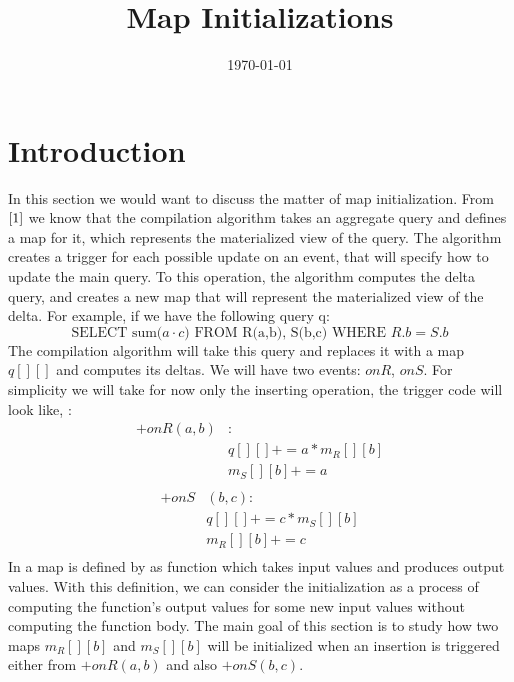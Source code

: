 \documentclass[12pt]{article}
\title{Map Initializations}
\date{\today}
\begin{document}
\maketitle
\section{Introduction}
In this section we would want to discuss the matter of map initialization. From $\cite{1}$ we know that the compilation algorithm takes an aggregate query and defines a map for it, which represents the materialized view of the query. The algorithm creates a trigger for each possible update on an event, that will specify how to update the main query. To this operation, the algorithm computes the delta query, and creates a new map that will represent the materialized view of the delta. For example, if we have the following query q:
\begin{equation}
\mbox{SELECT sum(}a\cdot c\mbox{) FROM R(a,b), S(b,c) WHERE } R.b=S.b
\end{equation}
The compilation algorithm will take this query and replaces it with a map $q[][]$ and computes its deltas. We will have two events: $onR$, $onS$. For simplicity we will take for now only the inserting operation, the trigger code will look like, :
\begin{align*}
+onR(a,b)&:\\
&q[][]+=a*m_R[][b]\\
&m_S[][b]+=a\\
\end{align*}\vspace{-40pt}
\begin{align*}
+onS&(b,c):\\
&q[][]+=c*m_S[][b]\\
&m_R[][b]+=c\\
\end{align*}
In \cite{1} a map is defined by as function which takes input values and produces output values. With this definition, we can consider the initialization as a process of computing the function's output values for some new input values without computing the function body.
The main goal of this section is to study how two maps $m_R[][b]$ and $m_S[][b]$ will be initialized when an insertion is triggered either from $+onR(a,b)$ and also $+onS(b,c)$. \\\par
\end{document}
